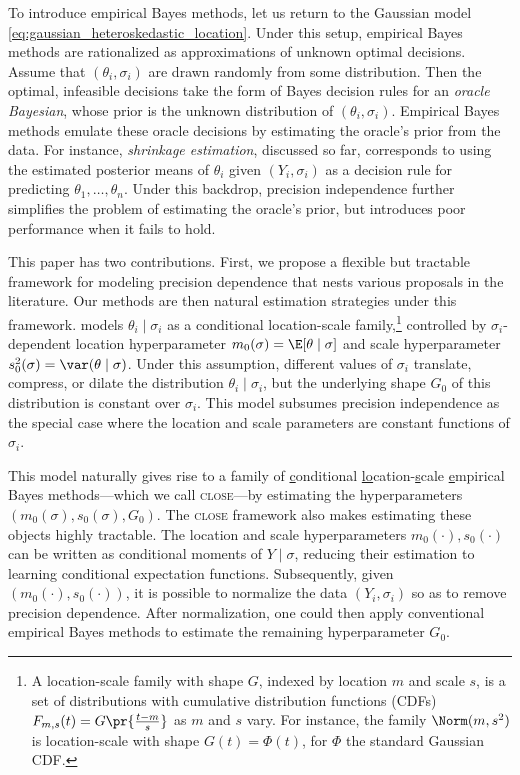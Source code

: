 \documentclass[12pt, reqno]{amsart}
\newcommand{\close}{\textsc{close}}
\numberwithin{equation}{section}
\begin{document}
To introduce empirical Bayes methods, let us return to the Gaussian model 
\eqref{eq:gaussian_heteroskedastic_location}. 
Under this setup, empirical Bayes methods are rationalized as approximations of unknown
optimal decisions. Assume that $(\theta_i, \sigma_i)$ are drawn randomly from some
distribution. Then the optimal, infeasible decisions take the form of Bayes decision
rules for an \emph{oracle Bayesian}, whose prior is the unknown distribution of $
(\theta_i,
\sigma_i)$. Empirical Bayes methods emulate these {oracle decisions} by estimating
 the {oracle's prior} from the data. For instance,
  \emph{shrinkage estimation}, discussed so far, corresponds to using the estimated
   posterior means of $\theta_i$ given $(Y_i, \sigma_i)$ as a decision rule for predicting
   $\theta_1,\ldots,\theta_n$. Under this backdrop, precision independence further
   simplifies the problem of estimating the oracle's prior, but introduces poor
   performance when it fails to hold. 

This paper has two contributions. First, we propose a flexible but tractable framework for
modeling precision dependence that nests various proposals in the literature. Our methods
are then natural estimation strategies under this framework.  models
$\theta_i \mid \sigma_i$ as a conditional location-scale family,\footnote
{A location-scale family with shape $G$, indexed by location $m$ and scale $s$, is a set
of distributions with cumulative distribution functions (CDFs) $F_ {m,s} (t) = G
\pr{\frac{t-m}{s}}$ as $m$ and $s$ vary. For instance, the family $\Norm(m,s^2)$ is
 location-scale with shape $G(t) = \Phi(t)$, for $\Phi$ the standard Gaussian CDF.}
 controlled by $\sigma_i$-dependent {location} hyperparameter $m_0 (\sigma) = \E
 [\theta \mid \sigma]$ and scale hyperparameter $s_0^2(\sigma) = \var(\theta
\mid \sigma)$. Under this assumption, different values of $\sigma_i$ translate, compress,
 or dilate the distribution $\theta_i \mid \sigma_i$, but the underlying {shape} $G_0$ of
 this distribution  is constant over $\sigma_i$. This model subsumes precision
 independence as the special case where the location and scale parameters are constant
 functions of $\sigma_i$. 

This model naturally gives rise to a family of \underline{c}onditional \underline{lo}cation-\underline{s}cale 
\underline{e}mpirical Bayes methods---which we call \close---by  estimating the
 hyperparameters $(m_0 (\sigma), s_0(\sigma),G_0)$. The \close{} framework also makes
 estimating these objects highly tractable. The location and scale hyperparameters $m_0
 (\cdot), s_0(\cdot)$ can be written as conditional moments of $Y \mid \sigma$, reducing
 their estimation to learning conditional expectation functions. Subsequently, given $
 (m_0(\cdot), s_0(\cdot))$, it is possible to normalize the data $(Y_i, \sigma_i)$ so as
 to remove precision dependence. After normalization, one could then apply conventional
 empirical Bayes methods to estimate the remaining
 hyperparameter $G_0$.
\end{document}
